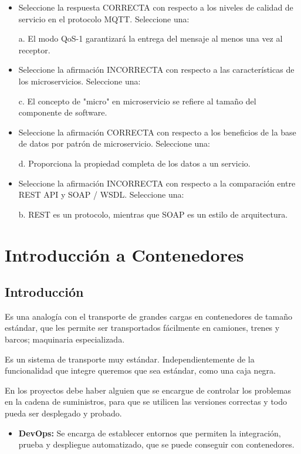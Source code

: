\documentclass[12pt]{report} %
\begin{document}
\begin{itemize}
	\item Seleccione la respuesta CORRECTA con respecto a los niveles de calidad de servicio en el protocolo MQTT.	Seleccione una:
	
	a. El modo QoS-1 garantizará la entrega del mensaje al menos una vez al receptor. 

	\item Seleccione la afirmación INCORRECTA con respecto a las características de los microservicios. Seleccione una:

	c. El concepto de "micro" en microservicio se refiere al tamaño del componente de software. 

	\item Seleccione la afirmación CORRECTA con respecto a los beneficios de la base de datos por patrón de microservicio. Seleccione una:

	d. Proporciona la propiedad completa de los datos a un servicio. 
	\item Seleccione la afirmación INCORRECTA con respecto a la comparación entre REST API y SOAP / WSDL. 	Seleccione una:

	b. REST es un protocolo, mientras que SOAP es un estilo de arquitectura. 
\end{itemize}

\chapter{Introducción a Contenedores}
\section{Introducción}
Es una analogía con el transporte de grandes cargas en contenedores de tamaño estándar, que les permite ser transportados fácilmente en camiones, trenes y barcos; maquinaria especializada. 

Es un sistema de transporte muy estándar. Independientemente de la funcionalidad que integre queremos que sea estándar, como una caja negra.

En los proyectos debe haber alguien que se encargue de controlar los problemas en la cadena de suministros, para que se utilicen las versiones correctas y todo pueda ser desplegado y probado.
\begin{itemize}
	\item \textbf{DevOps:} Se encarga de establecer entornos que permiten la integración, prueba y despliegue automatizado, que se puede conseguir con contenedores.
\end{itemize}
\end{document}
